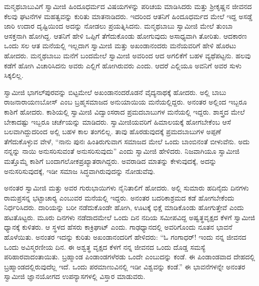 \vskip 2pt

ಮನ್ಮಥಬಾಬುವಿಗೆ ಸ್ವಾಮೀಜಿ ಹಿಂದೂಧರ್ಮದ ವಿಷಯಗಳನ್ನು ಪರಿಚಯ ಮಾಡಿಸಿದರು ಮತ್ತು ಶ‍್ರೀಕೃಷ್ಣನ ಜೀವನದ ಕೆಲವು ಘಟನೆಗಳ ಮಹತ್ವವನ್ನು ಕುರಿತು ಮಾತನಾಡಿದರು. ಇದರಿಂದ ಆತನಿಗೆ ಹಿಂದೂಧರ್ಮದ ಮೇಲೆ ಇದ್ದ ಅಸಡ್ಡೆ ಜಾರಿ ಉದಾರ ದೃಷ್ಟಿಯಿಂದ ಅದನ್ನು ನೋಡಲು ಪ್ರಯತ್ನಿಸಿದನು. ಮನ್ಮಥಬಾಬು ಸ್ವಾಮೀಜಿ ಮೇಲೆ ತುಂಬಾ ಆಸಕ್ತನಾಗಿ ಹೋಗಿದ್ದ. ಆತನಿಗೆ ಹೇಳಿ ಒಪ್ಪಿಗೆ ತೆಗೆದುಕೊಂಡು ಹೋಗುವುದು ಅಸಾಧ್ಯವಾಗಿ ತೋರಿತು. ಆದಕಾರಣ ಒಂದು ಸಲ ಆತ ಮನೆಯಲ್ಲಿ ಇಲ್ಲದಾಗ ಸ್ವಾಮೀಜಿ ಮತ್ತು ಅಖಂಡಾನಂದರು ಮನೆಯವರಿಗೆ ಹೇಳಿ ಹೊರಟು ಹೋದರು. ಮನ್ಮಥಬಾಬು ಮನೆಗೆ ಬಂದಮೇಲೆ ಸ್ವಾಮೀಜಿ ಅವರಿಂದ ಆದ ಅಗಲಿಕೆಗೆ ಬಹಳ ವ್ಯಥೆಪಟ್ಟನು. ಹಲವು ಕಡೆಗೆ ಹೋಗಿ ವಿಚಾರಿಸಿದನು ಅವರು ಎಲ್ಲಿಗೆ ಹೋಗಿರುವರು ಎಂದು. ಆದರೆ ಎಲ್ಲಿಯೂ ಅವನಿಗೆ ಅವರ ಸುಳು ಸಿಕ್ಕಲಿಲ್ಲ. 

\vskip 2pt

 ಸ್ವಾಮೀಜಿ ಭಾಗಲ್‍ಪುರವನ್ನು ಬಿಟ್ಟಮೇಲೆ ಅಖಂಡಾನಂದರೊಡನೆ ವೈದ್ಯನಾಥಕ್ಕೆ ಹೋದರು. ಅಲ್ಲಿ ಬಾಬು ರಾಜನಾರಾಯಣಬೋಸ್ ಎಂಬ ಬ್ರಹ್ಮಸಮಾಜದ ಅನುಯಾಯಿಯ ಮನೆಯಲ್ಲಿದ್ದರು. ಅನಂತರ ಅಲ್ಲಿಂದ ಇಬ್ಬರೂ ಕಾಶಿಗೆ ಹೋದರು. ಕಾಶಿಯಲ್ಲಿ ಸ್ವಾಮೀಜಿ ವಿದ್ವಾಂಸರಾದ ಪ್ರಮದಬಾಬುಗಳ ಮನೆಯಲ್ಲಿ ಇದ್ದರು. ಶಾಸ್ತ್ರದ ಮೇಲೆ ಬೇಕಾದಷ್ಟು ಇಬ್ಬರೂ ಚರ್ಚೆಯನ್ನು ಮಾಡಿದರು. ಸ್ವಾಮೀಜಿಯವರಿಗೆ ಹಿಮಾಲಯಕ್ಕೆ ಹೋಗಬೇಕೆಂಬ ಆಸೆ ಬಲವಾಗಿದ್ದುದರಿಂದ ಅಲ್ಲಿ ಬಹಳ ಕಾಲ ತಂಗಲಿಲ್ಲ. ತಾವು ಹೊರಡುವುದಕ್ಕೆ ಪ್ರಮದಬಾಬುಗಳ ಅಪ್ಪಣೆ ತೆಗೆದುಕೊಳ್ಳುವ ವೇಳೆ, “ನಾನು ಪುನಃ ಹಿಂತಿರುಗುವಾಗ ಸಮಾಜದ ಮೇಲೆ ಒಂದು ಬಾಂಬಿನಂತೆ ಬೀಳುವೆನು. ಅದು ನನ್ನನ್ನು ನಾಯಿ ಅನುಸರಿಸುವಂತೆ ಅನುಸರಿಸುವುದು” ಎಂದು ಸ್ವಾಮೀಜಿ ಹೇಳಿದರು. ನಿಜವಾಗಿಯೂ ಸ್ವಾಮೀಜಿ ಮತ್ತೊಮ್ಮೆ ಕಾಶಿಗೆ ಬಂದಾಗ\break ಲೋಕಪ್ರಖ್ಯಾತರಾಗಿದ್ದರು. ಅವರಾಡಿದ ಮಾತನ್ನು ಕೇಳುವುದಕ್ಕೆ, ಅದನ್ನು ಅನುಸರಿಸುವುದಕ್ಕೆ, ಇಡೀ ಸಮಾಜ ಸಿದ್ಧವಾಗಿರುವುದನ್ನು ನೋಡುವೆವು. 

ಅನಂತರ ಸ್ವಾಮೀಜಿ ಮತ್ತು ಅವರ ಗುರುಭಾಯಿಗಳು ನೈನಿತಾಲಿಗೆ ಹೋದರು. ಅಲ್ಲಿ ಸುಮಾರು ಹದಿನೈದು ದಿನಗಳು ರಾಮಪ್ರಸನ್ನ ಭಟ್ಟಾಚಾರ‍್ಯ ಎಂಬುವರ ಮನೆಯಲ್ಲಿ ಇದ್ದರು. ಅನಂತರ ಬದರಿಕಾಶ್ರಮದ ಕಡೆ ಹೋಗಬೇಕೆಂದು ನಿರ್ಧರಿಸಿದರು. ದಾರಿಯನ್ನು ಬರೀ ನಡೆದುಕೊಂಡೇ ಹೋಗಿ, ಊಟಕ್ಕೆ ಭಿಕ್ಷೆ ಮಾಡಿಕೊಂಡು ಹೋಗುತ್ತೇವೆ ಎಂದು ಹಟತೊಟ್ಟರು. ಮೂರು ದಿನಗಳು ನಡೆದಾದಮೇಲೆ ಒಂದು ದಿನ ನದಿಯ ಸಮೀಪವಿದ್ದ ಅಷ್ವತ್ಥವೃಕ್ಷದ ಕೆಳಗೆ ಸ್ವಾಮೀಜಿ ಧ್ಯಾನಕ್ಕೆ ಕುಳಿತರು. ಆ ಸ್ಥಳದ ಹೆಸರು ಕಾಕ್ರಿಘಾಟ್ ಎಂದು. ಗಾಢಧ್ಯಾನದಲ್ಲಿ ಅವರಿಗೊಂದು ನೂತನ ಭಾವನೆ ಹೊಳೆಯಿತು. ಅನಂತರ ಇದನ್ನು ಕುರಿತು ಅಖಂಡಾನಂದರಿಗೆ ಹೇಳಿದರು: “ಓ ಗಂಗಾಧರ್! ಇಂದು ನನ್ನ ಜೀವನದ ಒಂದು ಅವಿಸ್ಮರಣೀಯ ದಿನ. ಈ ಅಶ್ವತ್ಥ ವೃಕ್ಷದ ಕೆಳಗೆ ನನ್ನ ಜೀವನದ ಒಂದು ದೊಡ್ಡ ಸಮಸ್ಯೆ ಪರಿಹಾರವಾದಂತಾಯಿತು. ಬ್ರಹ್ಮಾಂಡ ಪಿಂಡಾಂಡಗಳೆರಡು ಒಂದೇ ಎಂಬುದನ್ನು ಕಂಡೆ. ಈ ಪಿಂಡಾಂಡವಾದ ದೇಹದಲ್ಲಿ ಬ್ರಹ್ಮಾಂಡದಲ್ಲಿರುವುದೆಲ್ಲ ಇದೆ. ಒಂದು ಪರಮಾಣುವಿನಲ್ಲಿ ಇಡೀ ವಿಶ್ವವನ್ನು ಕಂಡೆ.” ಈ ಭಾವನೆಗಳನ್ನೇ ಅನಂತರ ಸ್ವಾಮೀಜಿ ಜ್ಞಾನಯೋಗದ ಉಪನ್ಯಾಸಗಳಲ್ಲಿ ವಿಸ್ತಾರ ಮಾಡುವರು. 

